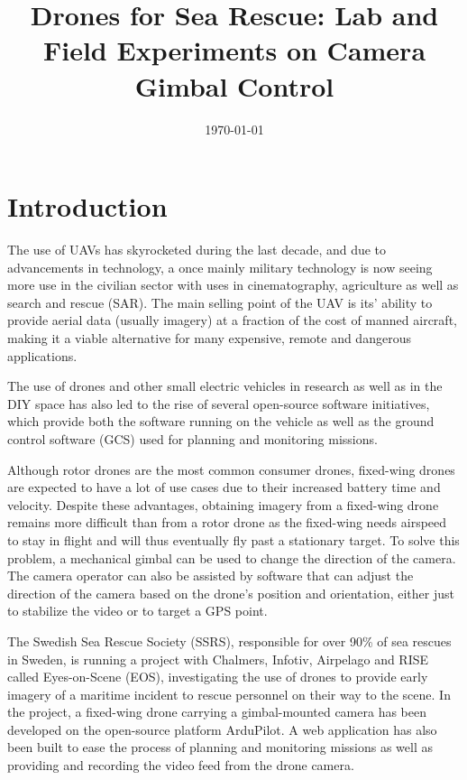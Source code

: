 \documentclass[nofilelist]{cslthse-msc}
\title{Drones for Sea Rescue: Lab and Field Experiments on Camera Gimbal Control}
\date{\today}
\begin{document}
\renewcommand{\bibname}{References}

\makefrontmatter


\chapter{Introduction}
The use of UAVs has skyrocketed during the last decade, and due to advancements in technology, a once mainly military technology is now seeing more use in the civilian sector with uses in cinematography, agriculture as well as search and rescue (SAR). The main selling point of the UAV is its' ability to provide aerial data (usually imagery) at a fraction of the cost of manned aircraft, making it a viable alternative for many expensive, remote and dangerous applications.

The use of drones and other small electric vehicles in research as well as in the DIY space has also led to the rise of several open-source software initiatives, which provide both the software running on the vehicle as well as the ground control software (GCS) used for planning and monitoring missions. 

Although rotor drones are the most common consumer drones, fixed-wing drones are expected to have a lot of use cases due to their increased battery time and velocity. Despite these advantages, obtaining imagery from a fixed-wing drone remains more difficult than from a rotor drone as the fixed-wing needs airspeed to stay in flight and will thus eventually fly past a stationary target. To solve this problem, a mechanical gimbal can be used to change the direction of the camera. The camera operator can also be assisted by software that can adjust the direction of the camera based on the drone's position and orientation, either just to stabilize the video or to target a GPS point.

The Swedish Sea Rescue Society (SSRS), responsible for over 90\% of sea rescues in Sweden, is running a project with Chalmers, Infotiv, Airpelago and RISE called Eyes-on-Scene (EOS), investigating the use of drones to provide early imagery of a maritime incident to rescue personnel on their way to the scene. In the project, a fixed-wing drone carrying a gimbal-mounted camera has been developed on the open-source platform ArduPilot. A web application has also been built to ease the process of planning and monitoring missions as well as providing and recording the video feed from the drone camera.
\end{document}
